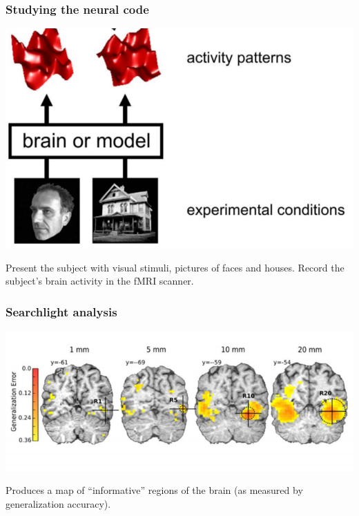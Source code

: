 \documentclass{beamer}
\begin{document}





\begin{frame}
\frametitle{Studying the neural code}
\begin{center}
\includegraphics[scale = 0.3]{k08_step1.png}
\end{center}
Present the subject with visual stimuli, pictures of faces and houses.
Record the subject's brain activity in the fMRI scanner.
\end{frame}

%
{

}

\begin{frame}
\frametitle{Searchlight analysis}
\begin{center}
\includegraphics[scale = 0.5]{searchlight_windowsize.png}
\end{center}
Produces a map of ``informative'' regions of the brain (as measured by generalization accuracy).
\end{frame}
\end{document}
